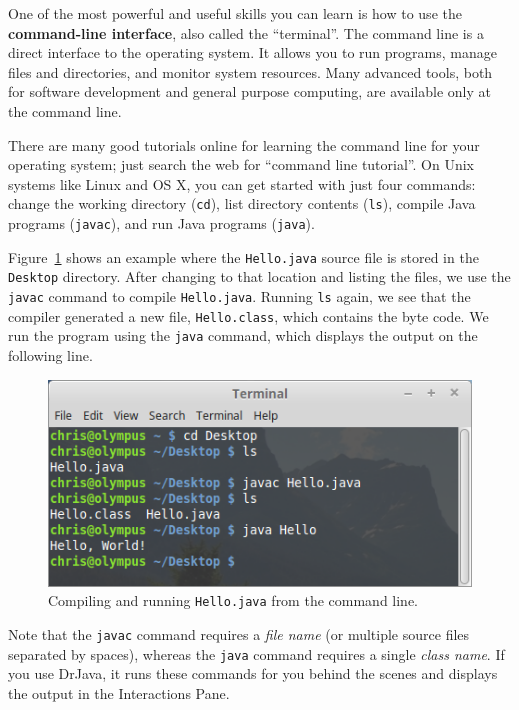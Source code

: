 \documentclass[12pt]{book}
\theoremstyle{exercise}
\begin{document}
One of the most powerful and useful skills you can learn is how to use the {\bf command-line interface}, also called the ``terminal''.
The command line is a direct interface to the operating system.
It allows you to run programs, manage files and directories, and monitor system resources.
Many advanced tools, both for software development and general purpose computing, are available only at the command line.

There are many good tutorials online for learning the command line for your operating system; just search the web for ``command line tutorial''.
On Unix systems like Linux and OS X, you can get started with just four commands: change the working directory ({\tt cd}), list directory contents ({\tt ls}), compile Java programs ({\tt javac}), and run Java programs ({\tt java}).

Figure~\ref{fig.commandline} shows an example where the {\tt Hello.java} source file is stored in the {\tt Desktop} directory.
After changing to that location and listing the files, we use the {\tt javac} command to compile {\tt Hello.java}.
Running {\tt ls} again, we see that the compiler generated a new file, {\tt Hello.class}, which contains the byte code.
We run the program using the {\tt java} command, which displays the output on the following line.


\begin{figure}[!ht]
\begin{center}
\includegraphics[width=4.5in]{figs/terminal.png}
\caption{Compiling and running {\tt Hello.java} from the command line.}
\label{fig.commandline}
\end{center}
\end{figure}

Note that the {\tt javac} command requires a {\em file name} (or multiple source files separated by spaces), whereas the {\tt java} command requires a single {\em class name}.
If you use DrJava, it runs these commands for you behind the scenes and displays the output in the Interactions Pane.
\end{document}
